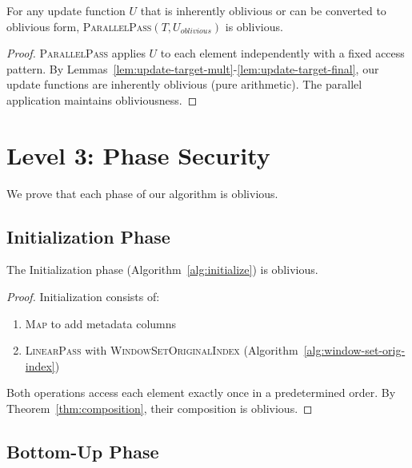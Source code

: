 \begin{lemma}
\label{lem:parallel-with-update}
For any update function $U$ that is inherently oblivious or can be converted to oblivious form, \textsc{ParallelPass}$(T, U_{oblivious})$ is oblivious.
\end{lemma}

\begin{proof}
\textsc{ParallelPass} applies $U$ to each element independently with a fixed access pattern. By Lemmas~\ref{lem:update-target-mult}-\ref{lem:update-target-final}, our update functions are inherently oblivious (pure arithmetic). The parallel application maintains obliviousness.\end{proof}

\section{Level 3: Phase Security}

We prove that each phase of our algorithm is oblivious.

\subsection{Initialization Phase}

\begin{lemma}
\label{lem:init-oblivious}
The Initialization phase (Algorithm~\ref{alg:initialize}) is oblivious.
\end{lemma}

\begin{proof}
Initialization consists of:
\begin{enumerate}
\item \textsc{Map} to add metadata columns
\item \textsc{LinearPass} with \textsc{WindowSetOriginalIndex} (Algorithm~\ref{alg:window-set-orig-index})
\end{enumerate}
Both operations access each element exactly once in a predetermined order. By Theorem~\ref{thm:composition}, their composition is oblivious.\end{proof}

\subsection{Bottom-Up Phase}

